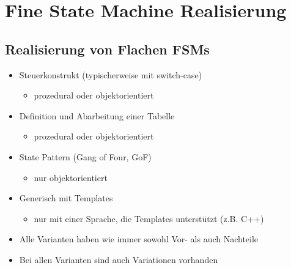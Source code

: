 \section{Fine State Machine Realisierung}

\subsection{Realisierung von Flachen FSMs}
\begin{multicols}{2}
\begin{itemize}
  \item Steuerkonstrukt (typischerweise mit switch-case)
  \begin{itemize}
    \item prozedural oder objektorientiert
   \end{itemize}
   \item Definition und Abarbeitung einer Tabelle
  \begin{itemize}
    \item prozedural oder objektorientiert
   \end{itemize}
   \item State Pattern (Gang of Four, GoF)
  \begin{itemize}
    \item nur objektorientiert
   \end{itemize}
   \item Generisch mit Templates
  \begin{itemize}
    \item nur mit einer Sprache, die Templates unterstützt (z.B. C++)
   \end{itemize}
   \item Alle Varianten haben wie immer sowohl Vor- als auch Nachteile
   \item Bei allen Varianten sind auch Variationen vorhanden
\end{itemize}
\end{multicols}

